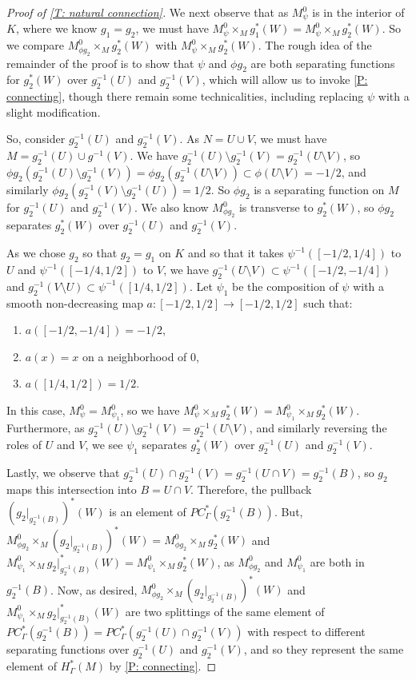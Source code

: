 \begin{proof}[Proof of \cref{T: natural connection}]
	We next observe that as $M^0_\psi$ is in the interior of $K$, where we know $g_1 = g_2$, we must have $M^0_\psi \times_M g_1^*(W) = M^0_\psi \times_M g_2^*(W)$.
	So we compare $M^0_{\phi g_2} \times_M g_2^*(W)$ with $M^0_\psi \times_M g_2^*(W)$.
	The rough idea of the remainder of the proof is to show that $\psi$ and $\phi g_2$ are both separating functions for $g_2^*(W)$ over $g_2^{-1}(U)$ and $g_2^{-1}(V)$, which will allow us to invoke \cref{P: connecting}, though there remain some technicalities, including replacing $\psi$ with a slight modification.

	So, consider $g_2^{-1}(U)$ and $g_2^{-1}(V)$. As $N = U \cup V$, we must have $M = g_2^{-1}(U) \cup g^{-1}(V)$.
	We have $g_2^{-1}(U)\setminus g_2^{-1}(V) = g_2^{-1}(U \setminus V)$, so $\phi g_2(g_2^{-1}(U)\setminus g_2^{-1}(V)) = \phi g_2(g_2^{-1}(U \setminus V)) \subset \phi(U \setminus V) =   -1/2$, and similarly  $\phi g_2(g_2^{-1}(V) \setminus g_2^{-1}(U)) = 1/2$.
	So $\phi g_2$ is a separating function on $M$ for $g_2^{-1}(U)$ and $g_2^{-1}(V)$.
	We also know $M^0_{\phi g_2}$ is transverse to $g_2^*(W)$, so $\phi g_2$ separates $g_2^*(W)$ over $g_2^{-1}(U)$ and $g_2^{-1}(V)$.

	As we chose $g_2$ so that $g_2 = g_1$ on $K$ and so that it takes $\psi^{-1}([-1/2,1/4])$ to $U$ and $\psi^{-1}([-1/4,1/2])$ to $V$, we have $g_2^{-1}(U \setminus V) \subset \psi^{-1}([-1/2,-1/4])$ and $g_2^{-1}(V \setminus U) \subset \psi^{-1}([1/4,1/2])$.
	Let $\psi_1$ be the composition of $\psi$ with a smooth non-decreasing map $a \colon [-1/2,1/2] \to [-1/2,1/2]$ such that:
	\begin{enumerate}
		\item $a([-1/2,-1/4]) = -1/2$,
		\item $a(x)=x$ on a neighborhood of $0$,
		\item $a([1/4,1/2]) = 1/2$.
	\end{enumerate}
	In this case, $M^0_\psi = M^0_{\psi_1}$, so we have $M^0_\psi \times_M g_2^*(W) = M^0_{\psi_1} \times_M g_2^*(W)$.
	Furthermore, as $g_2^{-1}(U) \setminus g_2^{-1}(V) = g_2^{-1}(U \setminus V)$, and similarly reversing the roles of $U$ and $V$, we see $\psi_1$ separates $g_2^*(W)$ over $g_2^{-1}(U)$ and $g_2^{-1}(V)$.

	Lastly, we observe that $g_2^{-1}(U) \cap g_2^{-1}(V) = g_2^{-1} (U \cap V) = g_2^{-1}(B)$, so $g_2$ maps this intersection into $B = U \cap V$.
	Therefore, the pullback $(g_2|_{g_2^{-1} (B)})^* (W)$ is an element of $PC^*_\Gamma(g_2^{-1} (B))$.
	But, $M^0_{\phi g_2} \times_M	(g_2|_{g_2^{-1} (B)})^* (W) = M^0_{\phi g_2} \times_M g_2^*(W)$ and $M^0_{\psi_1} \times_M g_2|_{g_2^{-1} (B)}^* (W) = M^0_{\psi_1} \times_M g_2^*(W)$, as $M^0_{\phi g_2}$ and $M^0_{\psi_1}$ are both in $g_2^{-1} (B)$.
	Now, as desired,  $M^0_{\phi g_2} \times_M	(g_2|_{g_2^{-1} (B)})^* (W)$ and $M^0_{\psi_1} \times_M g_2|_{g_2^{-1} (B)}^* (W)$ are two splittings of the same element of $PC^*_\Gamma(g_2^{-1} (B)) = PC^*_\Gamma(g_2^{-1}(U) \cap g_2^{-1}(V)) $ with respect to different separating functions over $g_2^{-1}(U)$ and $g_2^{-1}(V)$, and so they represent the same element of $H^*_\Gamma(M)$ by \cref{P: connecting}.
\end{proof}

